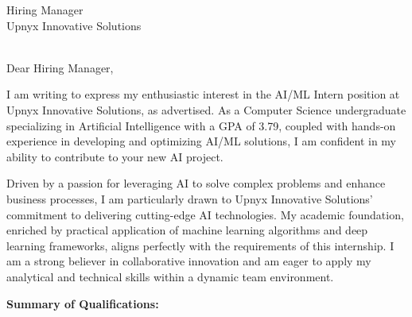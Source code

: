 \documentclass[10.5pt]{letter}
\date{\today}
\begin{document}
\begin{letter}{Hiring Manager\\Upnyx Innovative Solutions\\ [Insert Company Address if Known, or Remove Lines]\\}

\opening{Dear Hiring Manager,}

I am writing to express my enthusiastic interest in the AI/ML Intern position at Upnyx Innovative Solutions, as advertised. As a Computer Science undergraduate specializing in Artificial Intelligence with a GPA of 3.79, coupled with hands-on experience in developing and optimizing AI/ML solutions, I am confident in my ability to contribute to your new AI project.

Driven by a passion for leveraging AI to solve complex problems and enhance business processes, I am particularly drawn to Upnyx Innovative Solutions' commitment to delivering cutting-edge AI technologies. My academic foundation, enriched by practical application of machine learning algorithms and deep learning frameworks, aligns perfectly with the requirements of this internship. I am a strong believer in collaborative innovation and am eager to apply my analytical and technical skills within a dynamic team environment.

\vspace{0.3cm}
\textbf{Summary of Qualifications:}
\vspace{0.2cm}


\end{letter}
\end{document}
